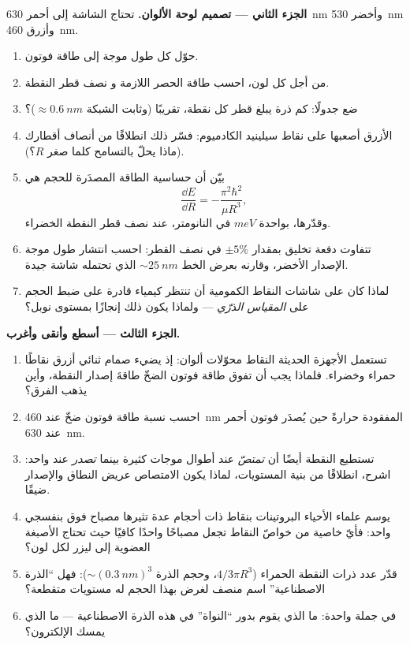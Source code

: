 \begin{problem}
\medskip\noindent\textbf{الجزء الثاني --- تصميم لوحة الألوان.}
تحتاج الشاشة إلى أحمر \qty{630}{nm} وأخضر \qty{530}{nm} وأزرق
\qty{460}{nm}.
\begin{enumerate}[resume]
  \item حوّل كل طول موجة إلى طاقة فوتون.
  \item من أجل كل لون، احسب طاقة الحصر اللازمة و
        نصف قطر النقطة.
  \item ضع جدولًا: كم ذرة يبلغ قطر كل نقطة، تقريبًا
        (وثابت الشبكة $\approx \qty{0.6}{nm}$)؟
  \item الأزرق أصعبها على نقاط سيلينيد الكادميوم: فسّر ذلك انطلاقًا من
        أنصاف أقطارك (ماذا يحلّ بالتسامح كلما صغر $R$؟).
  \item بيّن أن حساسية الطاقة المصدَرة للحجم هي
        \[
        \frac{\dd E}{\dd R} = -\frac{\pi^2\hbar^2}{\mu R^3} ,
        \]
        وقدّرها، بواحدة $\unit{meV}$ في النانومتر، عند نصف قطر
        النقطة الخضراء.
  \item تتفاوت دفعة تخليق بمقدار $\pm5\%$ في نصف القطر: احسب
        انتشار طول موجة الإصدار الأخضر، وقارنه
        بعرض الخط $\sim\qty{25}{nm}$ الذي تحتمله شاشة جيدة.
  \item لماذا كان على شاشات النقاط الكمومية أن تنتظر كيمياء
        قادرة على ضبط الحجم على \emph{المقياس الذرّي} --- ولماذا
        يكون ذلك إنجازًا بمستوى نوبل؟
\end{enumerate}

\medskip\noindent\textbf{الجزء الثالث --- أسطع وأنقى وأغرب.}
\begin{enumerate}[resume]
  \item تستعمل الأجهزة الحديثة النقاط محوّلات ألوان: إذ يضيء صمام
        ثنائي أزرق نقاطًا حمراء وخضراء. فلماذا يجب أن تفوق طاقة فوتون
        الضخّ طاقةَ إصدار النقطة، وأين يذهب
        الفرق؟
  \item احسب نسبة طاقة فوتون ضخّ عند \qty{460}{nm}
        المفقودة حرارةً حين يُصدَر فوتون أحمر عند \qty{630}{nm}.
  \item تستطيع النقطة أيضًا أن \emph{تمتصّ} عند أطوال موجات كثيرة بينما
        \emph{تصدر} عند واحد: اشرح، انطلاقًا من بنية المستويات، لماذا يكون
        الامتصاص عريض النطاق والإصدار ضيقًا.
  \item يوسم علماء الأحياء البروتينات بنقاط ذات أحجام عدة تثيرها
        مصباح فوق بنفسجي واحد: فأيّ خاصية من خواصّ النقاط تجعل مصباحًا
        واحدًا كافيًا حيث تحتاج الأصبغة العضوية إلى ليزر لكل لون؟
  \item قدّر عدد ذرات النقطة الحمراء ($4/3\pi R^3$،
        وحجم الذرة $\sim(\qty{0.3}{nm})^3$): فهل ``الذرة
        الاصطناعية'' اسم منصف لغرض بهذا الحجم له مستويات
        متقطعة؟
  \item في جملة واحدة: ما الذي يقوم بدور ``النواة'' في
        هذه الذرة الاصطناعية --- ما الذي يمسك الإلكترون؟
\end{enumerate}


\end{problem}

